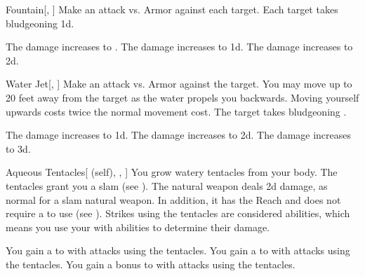 \lowercase{\hypertarget{spell:Fountain}{}}\label{spell:Fountain}
\begin{freeability}[Rank 1]{\hypertarget{spell:Fountain}{Fountain}}[, ]
Make an attack vs. Armor against each target.
\hit Each target takes bludgeoning  \minus1d.

\rankline
{} The damage increases to .
 The damage increases to  \plus1d.
 The damage increases to  \plus2d.
\end{freeability}
\vspace{0.25em}



\lowercase{\hypertarget{spell:Water Jet}{}}\label{spell:Water Jet}
\begin{freeability}[Rank 1]{\hypertarget{spell:Water Jet}{Water Jet}}[, ]
Make an attack vs. Armor against the target.
You may move up to 20 feet away from the target as the water propels you backwards.
Moving yourself upwards costs twice the normal movement cost.
\hit The target takes bludgeoning .

\rankline
{} The damage increases to  \plus1d.
 The damage increases to  \plus2d.
 The damage increases to  \plus3d.
\end{freeability}
\vspace{0.25em}



\lowercase{\hypertarget{spell:Aqueous Tentacles}{}}\label{spell:Aqueous Tentacles}
\begin{attuneability}[Rank 2]{\hypertarget{spell:Aqueous Tentacles}{Aqueous Tentacles}}[ (self), , ]
You grow watery tentacles from your body.
The tentacles grant you a slam  (see ).
The natural weapon deals \plus2d damage, as normal for a slam natural weapon.
In addition, it has the Reach  and does not require a  to use (see ).
Strikes using the tentacles are considered  abilities, which means you use your  with  abilities to determine their damage.

\rankline
{} You gain a   to  with attacks using the tentacles.
 You gain a   to  with attacks using the tentacles.
 You gain a  bonus to  with attacks using the tentacles.
\end{attuneability}
\vspace{0.25em}



